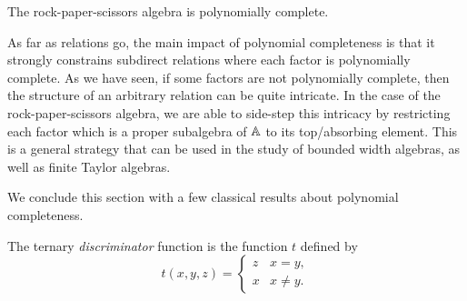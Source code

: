\documentclass[letterpaper,11pt]{article}
\begin{document}
\begin{cor} The rock-paper-scissors algebra is polynomially complete.
\end{cor}

As far as relations go, the main impact of polynomial completeness is that it strongly constrains subdirect relations where each factor is polynomially complete. As we have seen, if some factors are not polynomially complete, then the structure of an arbitrary relation can be quite intricate. In the case of the rock-paper-scissors algebra, we are able to side-step this intricacy by restricting each factor which is a proper subalgebra of $\mathbb{A}$ to its top/absorbing element. This is a general strategy that can be used in the study of bounded width algebras, as well as finite Taylor algebras.

We conclude this section with a few classical results about polynomial completeness.

\begin{defn} The ternary \emph{discriminator} function is the function $t$ defined by
\[
t(x,y,z) = \begin{cases} z & x = y,\\ x & x \ne y.\end{cases}
\]
\end{defn}
\end{document}
